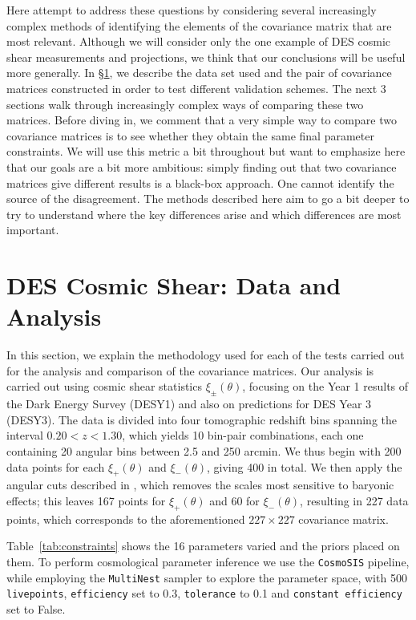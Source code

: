 \documentclass[twocolumn]{\docclass}
\begin{document}
Here attempt to address these questions by considering several increasingly complex methods of identifying the elements of the covariance matrix that are most relevant. Although we will consider only the one example of DES cosmic shear measurements and projections, we think that our conclusions will be useful more generally. In \S\ref{sec:methods}, we describe the data set used and the pair of covariance matrices constructed in order to test different validation schemes. The next 3 sections walk through increasingly complex ways of comparing these two matrices. Before diving in, we comment that a very simple way to compare two covariance matrices is to see whether they obtain the same final parameter constraints. We will use this metric a bit throughout but want to emphasize here that our goals are a bit more ambitious: simply finding out that two covariance matrices give different results is a black-box approach. One cannot identify the source of the disagreement. The methods described here aim to go a bit deeper to try to understand where the key differences arise and which differences are most important.
		
	\section{DES Cosmic Shear: Data and Analysis}
	\label{sec:methods}
	
	In this section, we explain the methodology used for each of the tests carried out for the analysis and comparison of the covariance matrices. Our analysis is carried out using cosmic shear statistics $\xi_\pm(\theta)$, focusing on the Year 1 results of the Dark Energy Survey \citep{Troxel:2017xyo,Abbott:2018cms} (DESY1) and also on predictions for DES Year 3 (DESY3). The data is divided into four tomographic redshift bins spanning the interval $0.20 < z < 1.30$, which yields 10 bin-pair combinations, each one containing 20 angular bins between 2.5 and 250 arcmin. We thus begin with 200 data points for each $\xi_+(\theta)$ and $\xi_-(\theta)$, giving 400 in total. We then apply the angular cuts described in \citep{Abbott:2018cms}, which removes the scales most sensitive to baryonic effects; this leaves 167 points for $\xi_+(\theta)$ and 60 for $\xi_-(\theta)$, resulting in 227 data points, which corresponds to the aforementioned $227 \times 227$ covariance matrix. 
		
Table~\ref{tab:constraints} shows the 16 parameters varied and the priors placed on them. To perform cosmological parameter inference we use the {\tt CosmoSIS} \citep{Zuntz:2015med} pipeline, while employing the {\tt MultiNest} \citep{Feroz:2009fhb} sampler to explore the parameter space, with 500 {\tt livepoints}, {\tt efficiency} set to 0.3, {\tt tolerance} to 0.1 and {\tt constant efficiency} set to False.
\end{document}

